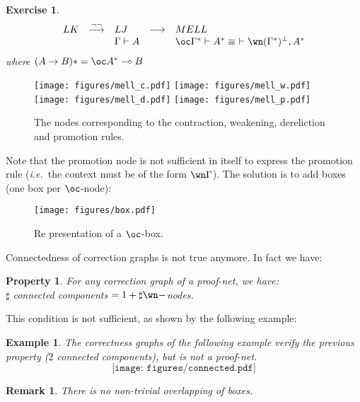 \documentclass[a4paper,10pt]{article}
\newcommand{\ie}{\textit{i.e.}\ }
\newtheorem{prop}{Property}
\newtheorem{ex}{Example}
\newtheorem{exo}{Exercise}
\newtheorem{rmk}{Remark}
\begin{document}
	\begin{exo}
		$$\begin{array}{l l l l l}
			LK & \overset{\lnot\lnot}{\longrightarrow} &  LJ & \longrightarrow & MELL \\
			& & \Gamma \vdash A & & \oc \Gamma ^* \vdash A^* \equiv\ \vdash \wn(\Gamma ^ *)^\perp, A^*
		\end{array}$$
		where $(A \rightarrow B)* = \oc  A^* \multimap B$		
	\end{exo}	

	\begin{figure}[h]
	\begin{center}
		\texttt{[image: figures/mell\_c.pdf]} \quad
		\texttt{[image: figures/mell\_w.pdf]} \quad
		\texttt{[image: figures/mell\_d.pdf]}	\quad
		\texttt{[image: figures/mell\_p.pdf]}	\quad
		\caption{The nodes corresponding to the contraction, weakening, dereliction and promotion rules.}
	\end{center}	
	\end{figure}	
	
	Note that the promotion node is not sufficient in itself to express the promotion rule (\ie the context must be of the form $\wn\Gamma$).
	The solution is to add boxes (one box per $\oc $-node):
	\begin{figure}[h]
	\begin{center}
		\texttt{[image: figures/box.pdf]}
		\caption{Re presentation of a $\oc $-box.}
	\end{center}	
	\end{figure}
	
	Connectedness of correction graphs is not true anymore. In fact we have:
	
	\begin{prop}
		For any correction graph of a proof-net, we have: \\ $\sharp$ connected components $=1+ \sharp \wn-$nodes.
	\end{prop}	
	
	This condition is not sufficient, as shown by the following example:
	
	\begin{ex}
		The correctness graphs of the following example verify the previous property ($2$ connected components), but is not a proof-net.
	$$\texttt{[image: figures/connected.pdf]}$$
	\end{ex}
	
	\begin{rmk}
		There is no non-trivial overlapping of boxes.
	\end{rmk}	
	
\end{document}
